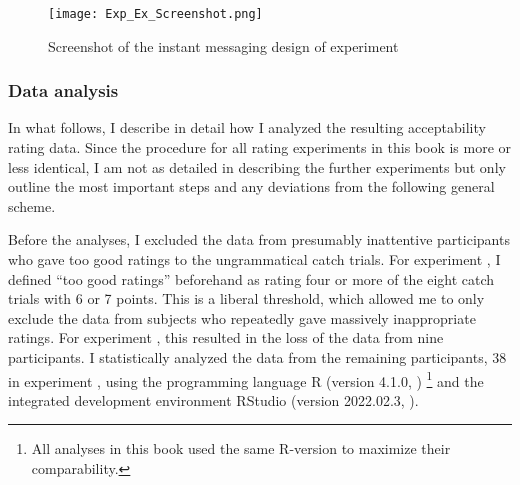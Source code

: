 \begin{figure}
\centering
\texttt{[image: Exp\_Ex\_Screenshot.png]}
\caption{Screenshot of the instant messaging design of experiment }
\label{fig:wa.design}
\end{figure}

\subsubsection{Data analysis} \label{sec:data.analysis}
In what follows, I describe in detail how I analyzed the resulting acceptability rating data.
Since the procedure for all rating experiments in this book is more or less identical, I am not as detailed in describing the further experiments but only outline the most important steps and any deviations from the following general scheme.

Before the analyses, I excluded the data from presumably inattentive participants who gave too good ratings to the ungrammatical catch trials.
For experiment , I defined ``too good ratings'' beforehand as rating four or more of the eight catch trials with 6 or 7 points.
This is a liberal threshold, which allowed me to only exclude the data from subjects who repeatedly gave massively inappropriate ratings.
For experiment , this resulted in the loss of the data from nine participants.
I statistically analyzed the data from the remaining participants, 38 in experiment , using the programming language R (version 4.1.0, \cite{rcoreteam2021})%
\footnote{All analyses in this book used the same R-version to maximize their comparability.}
%
and the integrated development environment RStudio (version 2022.02.3, \cite{rstudioteam2021}).

